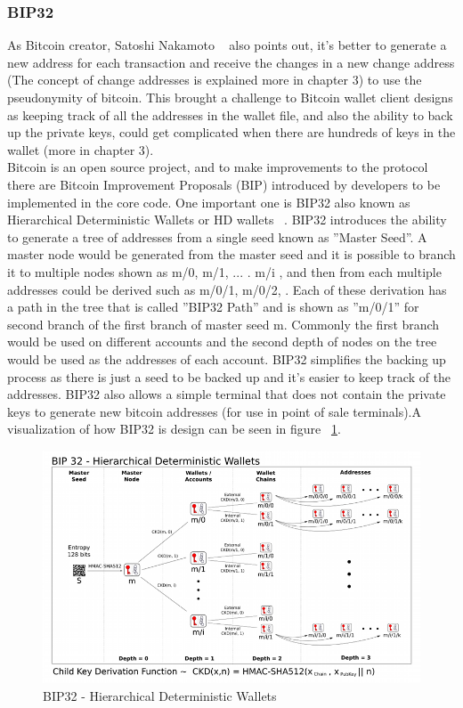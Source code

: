 \subsubsection{BIP32}
As Bitcoin creator, Satoshi Nakamoto ~\cite{Nak08} also points out, it's better to generate a new address for each transaction and receive the changes in a new change address (The concept of change addresses is explained more in chapter 3) to use the pseudonymity of bitcoin. This brought a challenge to Bitcoin wallet client designs as keeping track of all the addresses in the wallet file, and also the ability to back up the private keys, could get complicated when there are hundreds of keys in the wallet (more in chapter 3). \\
Bitcoin is an open source project, and to make improvements to the protocol there are Bitcoin Improvement Proposals (BIP) introduced by developers to be implemented in the core code. One important one is BIP32 also known as Hierarchical Deterministic Wallets or HD wallets ~\cite{bip32}. BIP32 introduces the ability to generate a tree of addresses from a single seed known as ''Master Seed''. A master node would be generated from the master seed and it is possible to branch it to multiple nodes shown as m/0, m/1, ... . m/i , and then from each multiple addresses could be derived such as m/0/1, m/0/2, \etc. Each of these derivation has a path in the tree that is called ''BIP32 Path'' and is shown as ''m/0/1'' for second branch of the first branch of master seed m. Commonly the first branch would be used on different accounts and the second depth of nodes on the tree would be used as the addresses of each account. BIP32 simplifies the backing up process as there is just a seed to be backed up and it's easier to keep track of the addresses. BIP32 also allows a simple terminal that does not contain the private keys to generate new bitcoin addresses (for use in point of sale terminals).A visualization of how BIP32 is design can be seen in figure ~\ref{fig:bip32}.

\begin{figure}
\centering
\includegraphics[width=\linewidth]{fig/bip32derivation.png}
  \caption{BIP32 - Hierarchical Deterministic Wallets ~\cite{bip32proposal}}
\label{fig:bip32}
\end{figure}


